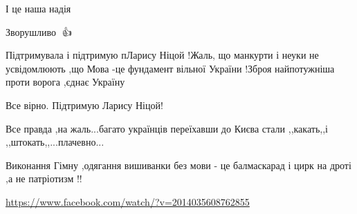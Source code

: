 \begin{itemize}
 
І це наша надія

 
Зворушливо 🥰👍🇺🇦

 

Підтримувала і підтримую пЛарису Ніцой !Жаль, що манкурти і неуки не
усвідомлюють ,що Мова -це фундамент вільної України !Зброя найпотужніша проти
ворога ,єднає Україну



 
Все вірно. Підтримую Ларису Ніцой!


 
Все правда ,на жаль...багато українців переїхавши до Києва стали ,,какать,,і ,,штокать,,...плачевно...

 
Виконання Гімну ,одягання вишиванки без мови - це балмаскарад і цирк на дроті ,а не патріотизм !! 

\url{https://www.facebook.com/watch/?v=2014035608762855}



\end{itemize}
